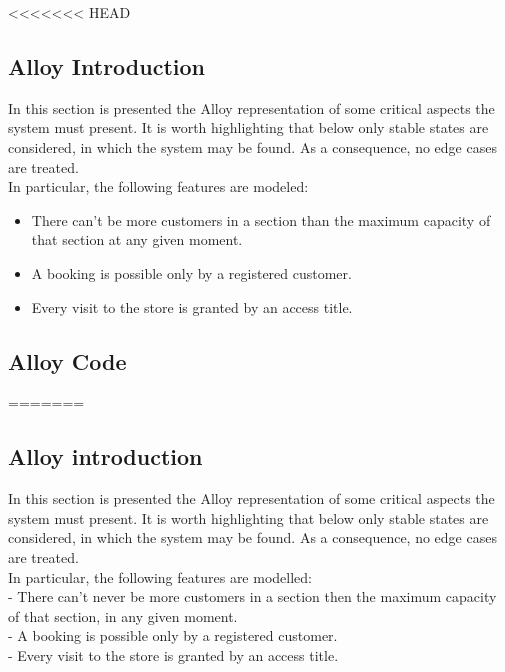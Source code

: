 <<<<<<< HEAD
\subsection{Alloy Introduction}

In this section is presented the Alloy representation of some critical aspects the system must present.
It is worth highlighting that below only stable states are considered, in which the system may be found.
As a consequence, no edge cases are treated. \\
In particular, the following features are modeled:
\begin{itemize}
    \item There can't be more customers in a section than the maximum capacity of that section at any given moment.
    \item A booking is possible only by a registered customer.
    \item Every visit to the store is granted by an access title.
\end{itemize}

\subsection{Alloy Code}
=======
\subsection{Alloy introduction}

In this section is presented the Alloy representation of some critical
aspects the system must present. It is worth highlighting that below only
stable states are considered, in which the system may be found. As a
consequence, no edge cases are treated. \\
In particular, the following features are modelled:\\
- There can't never be more customers in a section then the maximum capacity of that section, in any given moment.\\
- A booking is possible only by a registered customer.\\
- Every visit to the store is granted by an access title.\\

